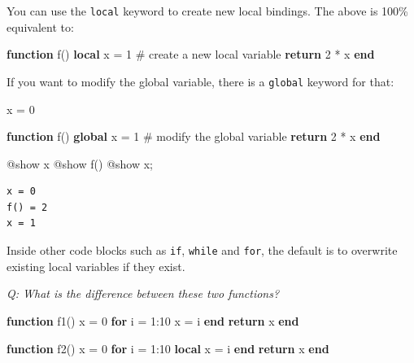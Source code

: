 \documentclass[
]{article}
\newenvironment{Shaded}{\begin{snugshade}}{\end{snugshade}}
\newcommand{\CommentTok}[1]{\textcolor[rgb]{0.37,0.37,0.37}{#1}}
\newcommand{\ControlFlowTok}[1]{\textcolor[rgb]{0.00,0.23,0.31}{\textbf{#1}}}
\newcommand{\FloatTok}[1]{\textcolor[rgb]{0.68,0.00,0.00}{#1}}
\newcommand{\FunctionTok}[1]{\textcolor[rgb]{0.28,0.35,0.67}{#1}}
\newcommand{\KeywordTok}[1]{\textcolor[rgb]{0.00,0.23,0.31}{\textbf{#1}}}
\newcommand{\NormalTok}[1]{\textcolor[rgb]{0.00,0.23,0.31}{#1}}
\newcommand{\OperatorTok}[1]{\textcolor[rgb]{0.37,0.37,0.37}{#1}}
\newcommand{\PreprocessorTok}[1]{\textcolor[rgb]{0.68,0.00,0.00}{#1}}
\begin{document}
You can use the \texttt{local} keyword to create new local bindings. The
above is 100\% equivalent to:

\begin{Shaded}
\begin{Highlighting}[]
\KeywordTok{function} \FunctionTok{f}\NormalTok{()}
   \KeywordTok{local}\NormalTok{ x }\OperatorTok{=} \FloatTok{1} \CommentTok{\# create a new local variable}
   \ControlFlowTok{return} \FloatTok{2} \OperatorTok{*}\NormalTok{ x}
\KeywordTok{end}
\end{Highlighting}
\end{Shaded}

If you want to modify the global variable, there is a \texttt{global}
keyword for that:

\begin{Shaded}
\begin{Highlighting}[]
\NormalTok{x }\OperatorTok{=} \FloatTok{0}

\KeywordTok{function} \FunctionTok{f}\NormalTok{()}
   \KeywordTok{global}\NormalTok{ x }\OperatorTok{=} \FloatTok{1} \CommentTok{\# modify the global variable}
   \ControlFlowTok{return} \FloatTok{2} \OperatorTok{*}\NormalTok{ x}
\KeywordTok{end}

\PreprocessorTok{@show}\NormalTok{ x}
\PreprocessorTok{@show} \FunctionTok{f}\NormalTok{()}
\PreprocessorTok{@show}\NormalTok{ x;}
\end{Highlighting}
\end{Shaded}

\begin{verbatim}
x = 0
f() = 2
x = 1
\end{verbatim}

Inside other code blocks such as \texttt{if}, \texttt{while} and
\texttt{for}, the default is to overwrite existing local variables if
they exist.

\emph{Q: What is the difference between these two functions?}

\begin{Shaded}
\begin{Highlighting}[]
\KeywordTok{function} \FunctionTok{f1}\NormalTok{()}
\NormalTok{   x }\OperatorTok{=} \FloatTok{0}
   \ControlFlowTok{for}\NormalTok{ i }\OperatorTok{=} \FloatTok{1}\OperatorTok{:}\FloatTok{10}
\NormalTok{   x }\OperatorTok{=}\NormalTok{ i}
   \ControlFlowTok{end}
   \ControlFlowTok{return}\NormalTok{ x}
\KeywordTok{end}

\KeywordTok{function} \FunctionTok{f2}\NormalTok{()}
\NormalTok{   x }\OperatorTok{=} \FloatTok{0}
   \ControlFlowTok{for}\NormalTok{ i }\OperatorTok{=} \FloatTok{1}\OperatorTok{:}\FloatTok{10}
   \KeywordTok{local}\NormalTok{ x }\OperatorTok{=}\NormalTok{ i}
   \ControlFlowTok{end}
   \ControlFlowTok{return}\NormalTok{ x}
\KeywordTok{end}
\end{Highlighting}
\end{Shaded}
\end{document}

